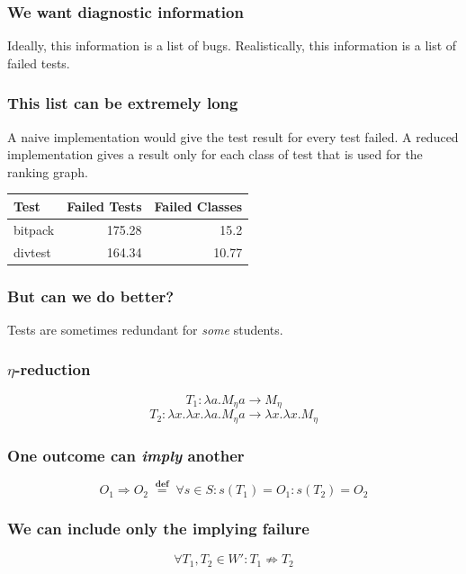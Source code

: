 \documentclass[svgnames,14pt]{beamer}
\newcommand\defined{\mathrel{\;\stackrel{\scriptscriptstyle\mathbf{def}}{=}\;}}
\theoremstyle{definition}
\begin{document}
\begin{frame}
\frametitle{We want diagnostic information}
Ideally, this information is a list of bugs.
\newline\newline
Realistically, this information is a list of failed tests.
\end{frame}

\begin{frame}
\frametitle{This list can be extremely long}
A naive implementation would give the test result for every test failed.
\newline\newline
A reduced implementation gives a result only for each class of test that is used for the ranking graph.
\end{frame}


\begin{frame}
\def\?{\phantom0}
\centering
\begin{tabular}{ | l | r | r |}
\hline
Test & Failed Tests & Failed Classes \\
\hline
bitpack & 175.28 & 15.2 \\
divtest & 164.34 & 10.77 \\
\hline
\end{tabular}
\end{frame}

\begin{frame}
\frametitle{But can we do better?}
Tests are sometimes redundant for \emph{some} students.
\end{frame}

\begin{frame}
\frametitle{$\eta$-reduction}
$$T_1 : \lambda a.M_\eta a \longrightarrow M_\eta$$
$$T_2 : \lambda x.\lambda x.\lambda a.M_\eta a \longrightarrow \lambda x.\lambda x.M_\eta$$
\end{frame}

\begin{frame}

\end{frame}

\begin{frame}
\frametitle{One outcome can \emph{imply} another}
\begin{block}{}
$$O_1 \Rightarrow O_2 \defined \forall s \in S : s(T_1) = O_1 : s(T_2) = O_2$$
\end{block}
\end{frame}

\begin{frame}
\frametitle{We can include only the implying failure}
\begin{block}{}
$$\forall T_1, T_2 \in W' : T_1 \not\Rightarrow T_2$$
\end{block}
\end{frame}
\end{document}
